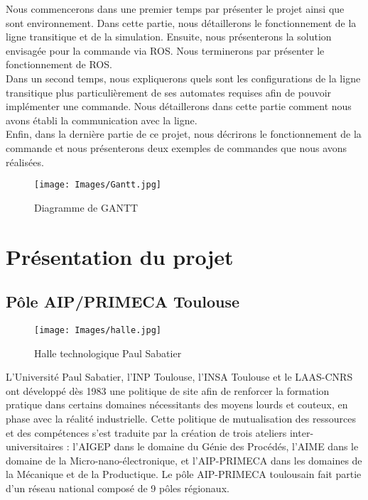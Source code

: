 \documentclass[a4paper,french, titlepage]{book}
\begin{document}
Nous commencerons dans une premier temps par présenter le projet ainsi que sont environnement. Dans cette partie, nous détaillerons le fonctionnement de la ligne transitique et de la simulation. Ensuite, nous présenterons la solution envisagée pour la commande via ROS. Nous terminerons par présenter le fonctionnement de ROS.\\

Dans un second temps, nous expliquerons quels sont les configurations de la ligne transitique plus particulièrement de ses automates requises afin de pouvoir implémenter une commande. Nous détaillerons dans cette partie comment nous avons établi la communication avec la ligne.\\

Enfin, dans la dernière partie de ce projet, nous décrirons le fonctionnement de la commande et nous présenterons deux exemples de commandes que nous avons réalisées.\\

\newpage
\begin{figure}[H]
	     \begin{center}
	     \texttt{[image: Images/Gantt.jpg]} 
	     \end{center}
	     \caption{Diagramme de GANTT}
	     \label{Gantt}
\end{figure}


\newpage
\chapter{Présentation du projet}

\section{Pôle AIP/PRIMECA Toulouse}

\vspace{0.2cm}

\begin{wrapfigure}[12]{r}{6.8cm}
\texttt{[image: Images/halle.jpg]}
\caption{Halle technologique Paul Sabatier}
\label{Halle technologique Paul Sabatier}
\end{wrapfigure}

L'Université Paul Sabatier, l'INP Toulouse, l'INSA Toulouse et le LAAS-CNRS ont développé dès 1983 une politique de site afin de renforcer la formation pratique dans certains domaines nécessitants des moyens lourds et couteux, en phase avec la réalité industrielle. Cette politique de mutualisation des ressources et des compétences s'est traduite par la création de trois ateliers inter-universitaires : l'AIGEP dans le domaine du Génie des Procédés, l'AIME dans le domaine de la Micro-nano-électronique, et l'AIP-PRIMECA dans les domaines de la Mécanique et de la Productique. Le pôle AIP-PRIMECA toulousain fait partie d'un réseau national composé de 9 pôles régionaux.\\
\end{document}
